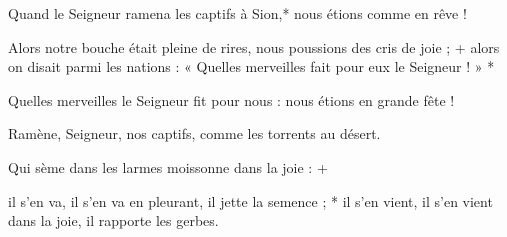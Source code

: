 \item Quand le Seigneur ramena les captifs à Sion,* nous étions comme en rêve !

\item Alors notre bouche était pleine de rires, nous poussions des cris de joie ; + alors on disait parmi les nations : « Quelles merveilles fait pour eux le Seigneur ! » *

\item Quelles merveilles le Seigneur fit pour nous : nous étions en grande fête !

\item Ramène, Seigneur, nos captifs, comme les torrents au désert.

\item Qui sème dans les larmes moissonne dans la joie : +

\item il s'en va, il s'en va en pleurant, il jette la semence ; * il s'en vient, il s'en vient dans la joie, il rapporte les gerbes.
